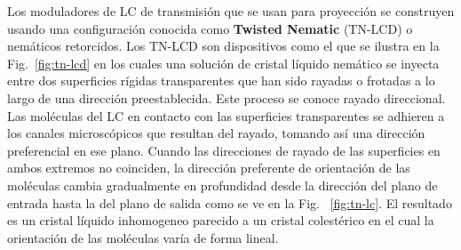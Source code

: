 Los moduladores de LC de transmisión que se usan para proyección se
construyen usando una configuración conocida como \textbf{Twisted
Nematic} (\acrshort{TN-LCD}) o nemáticos retorcidos. Los TN-LCD son
dispositivos como el que se ilustra en la Fig.~\ref{fig:tn-lcd} en
los cuales una  solución de cristal líquido nemático se inyecta entre
dos superficies rígidas transparentes que han sido rayadas o frotadas
a lo largo de una dirección preestablecida. Este proceso se conoce
rayado direccional. Las moléculas del LC en
contacto con las superficies transparentes se adhieren a los canales
microscópicos que resultan del rayado, tomando así una
dirección preferencial en ese plano. Cuando las 
direcciones de rayado de las superficies en ambos extremos no
coinciden, la dirección preferente de orientación de las moléculas
cambia gradualmente en profundidad desde la dirección del plano de
entrada hasta la del plano de salida como se ve en la Fig.~
\ref{fig:tn-lc}.  El resultado es un cristal líquido inhomogeneo
parecido a un cristal colestérico en el cual la orientación de las
moléculas varía de forma lineal.

